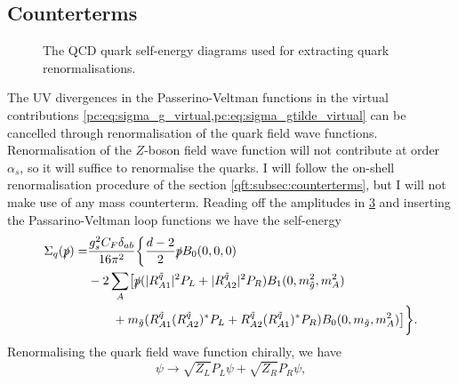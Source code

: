 \documentclass[../main.tex]{subfiles}
\begin{document}
\subsection{Counterterms}
\begin{figure}[ht!]
  \centering
  \begin{subfigure}{.49\textwidth}
    \centering
    \caption{}
    \label{pc:subfig:quarkSE_gluon}
  \end{subfigure}
  \begin{subfigure}{.49\textwidth}
    \centering
    \caption{}
    \label{pc:subfig:quarkSE_gluino}
  \end{subfigure}
  \caption{The QCD quark self-energy diagrams used for extracting quark renormalisations.}
  \label{pc:fig:quarkSE}
\end{figure}
The UV divergences in the Passerino-Veltman functions in the virtual contributions \cref{pc:eq:sigma_g_virtual,pc:eq:sigma_gtilde_virtual} can be cancelled through renormalisation of the quark field wave functions.
Renormalisation of the \(Z\)-boson field wave function will not contribute at order \(\alpha_s\), so it will suffice to renormalise the quarks.
I will follow the on-shell renormalisation procedure of the section \cref{qft:subsec:counterterms}, but I will not make use of any mass counterterm.
Reading off the amplitudes in \cref{pc:fig:quarkSE} and inserting the Passarino-Veltman loop functions we have the self-energy
\begin{align}
  \label{pc:eq:quarkSE}
  \nonumber
  \Sigma_q(\slashed{p}) = & \frac{g_s^2 C_F \delta_{ab}}{16\pi^2} \biggl\{
  \frac{d-2}{2} \slashed{p} B_0(0,0,0)                                                                                                                                                \\
  \nonumber
                          & - 2\sum_A \bigl[
  \slashed{p} (|R^{\tilde{q}}_{A1}|^2P_L + |R^{\tilde{q}}_{A2}|^2P_R)B_1(0,m_{\tilde{g}}^2,m_A^2)                                                                                     \\
                          & \qquad + m_{\tilde{g}} (R^{\tilde{q}}_{A1} (R^{\tilde{q}}_{A2})^\ast P_L + R^{\tilde{q}}_{A2} (R^{\tilde{q}}_{A1})^\ast P_R) B_0(0, m_{\tilde{g}}, m_A^2)
  \bigr]\biggr\}.
\end{align}
Renormalising the quark field wave function chirally, we have
\begin{equation}
  \psi \to \sqrt{Z_L} P_L \psi + \sqrt{Z_R} P_R \psi,
\end{equation}
\end{document}
